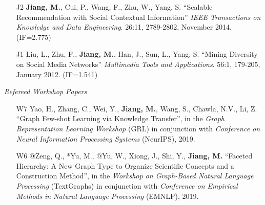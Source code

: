\documentclass[10pt]{article}
\newenvironment{myindentpar}[1]%
{\begin{list}{}%
         {\setlength{\leftmargin}{#1}}%
         \item[]%
}
{\end{list}}
\newcounter{list}
\newcommand{\hide}[1]{}
\begin{document}
\begin{myindentpar}{0.00cm}
\begin{enumerate}[leftmargin=.5cm]
\item[J2] \textbf{Jiang, M.}, Cui, P., Wang, F., Zhu, W., Yang, S. ``Scalable Recommendation with Social Contextual Information'' \textit{IEEE Transactions on Knowledge and Data Engineering}. 26:11, 2789-2802, November 2014. (IF=2.775)

	\hide{\vspace{-0.1cm}\hspace{0.5cm}{\small \emph{I conceived the idea in consultation with Dr. Cui. I designed the study, completed the experiments, and wrote the paper. Dr. Cui edited the paper.}}}

\item[J1] Liu, L., Zhu, F., \textbf{Jiang, M.}, Han, J., Sun, L., Yang, S. ``Mining Diversity on Social Media Networks'' \textit{Multimedia Tools and Applications}. 56:1, 179-205, January 2012. (IF=1.541)

	\hide{\vspace{-0.1cm}\hspace{0.5cm}{\small \emph{Ms. Liu conceived the idea in consultation with myself. Ms. Liu, her colleague Dr. Zhu, and I implemented the system and completed the experiments.}}}

\end{enumerate}

\hspace{-0.25cm}\emph{Refereed Workshop Papers}

\begin{enumerate}[leftmargin=.5cm]

\item[W7] Yao, H., Zhang, C., Wei, Y., \textbf{Jiang, M.}, Wang, S., Chawla, N.V., Li, Z. ``Graph Few-shot Learning via Knowledge Transfer'', in the \textit{Graph Representation Learning Workshop} (GRL) in conjunction with \textit{Conference on Neural Information Processing Systems} (NeurIPS), 2019.
	
	\hide{\vspace{-0.1cm}\hspace{0.5cm}{\small \emph{I made 5\% contribution. I joined the discussions and reviewed the paper.}}}
	
\item[W6] @Zeng, Q., *Yu, M., @Yu, W., Xiong, J., Shi, Y., \textbf{Jiang, M.} ``Faceted Hierarchy: A New Graph Type to Organize Scientific Concepts and a Construction Method'', in the \textit{Workshop on Graph-Based Natural Language Processing} (TextGraphs) in conjunction with \textit{Conference on Empirical Methods in Natural Language Processing} (EMNLP), 2019.


\end{enumerate}
\end{myindentpar}
\end{document}
